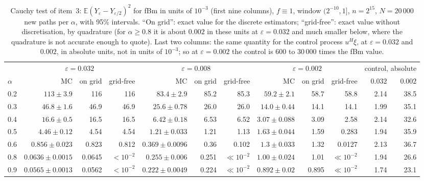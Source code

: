 \documentclass[11pt]{article}
\theoremstyle{remark}
\theoremstyle{definition}
\newcommand{\E}{\mathbb{E}}
\begin{document}
\begin{table}[t]
\centering\scriptsize
\setlength{\tabcolsep}{1.9pt}
\begin{tabular}{@{}lrrrrrrrrrrr@{}}
\toprule
 & \multicolumn{3}{c}{$\varepsilon=0.032$} & \multicolumn{3}{c}{$\varepsilon=0.008$} & \multicolumn{3}{c}{$\varepsilon=0.002$} & \multicolumn{2}{c}{control, absolute}\\
\cmidrule(lr){2-4}\cmidrule(lr){5-7}\cmidrule(lr){8-10}\cmidrule(l){11-12}
$\alpha$ & MC & on grid & grid-free & MC & on grid & grid-free & MC & on grid & grid-free & $0.032$ & $0.002$\\
\midrule
0.2 & $113\pm3.9$ & 116 & 116 & $83.4\pm2.9$ & 85.2 & 85.3 & $59.2\pm2.1$ & 58.7 & 58.8 & 2.14 & 38.5\\
0.3 & $46.8\pm1.6$ & 46.9 & 46.9 & $25.6\pm0.78$ & 26.0 & 26.0 & $14.0\pm0.44$ & 14.1 & 14.1 & 1.99 & 35.1\\
0.4 & $16.6\pm0.5$ & 16.5 & 16.5 & $6.42\pm0.18$ & 6.53 & 6.52 & $3.07\pm0.088$ & 3.09 & 2.58 & 2.14 & 32.6\\
0.5 & $4.46\pm0.12$ & 4.54 & 4.54 & $1.21\pm0.033$ & 1.21 & 1.13 & $1.63\pm0.044$ & 1.59 & 0.283 & 1.94 & 35.9\\
0.6 & $0.856\pm0.023$ & 0.823 & 0.812 & $0.369\pm0.0096$ & 0.36 & 0.102 & $1.3\pm0.033$ & 1.32 & 0.0127 & 2.13 & 36.7\\
0.8 & $0.0636\pm0.0015$ & 0.0645 & $<10^{-2}$ & $0.255\pm0.006$ & 0.251 & $\ll10^{-2}$ & $1.00\pm0.024$ & 1.01 & $\ll10^{-2}$ & 1.94 & 26.6\\
0.9 & $0.0565\pm0.0013$ & 0.0562 & $<10^{-2}$ & $0.222\pm0.0049$ & 0.224 & $\ll10^{-2}$ & $0.892\pm0.02$ & 0.895 & $\ll10^{-2}$ & 1.74 & 23.1\\
\bottomrule
\end{tabular}
\caption{Cauchy test of item~3: $\E(Y_\varepsilon-Y_{\varepsilon/2})^2$ for fBm in units of $10^{-3}$ (first nine columns), $f\equiv1$, window $(2^{-10},1]$, $n=2^{15}$, $N=20\,000$ new paths per $\alpha$, with 95\% intervals. ``On grid'': exact value for the discrete estimators; ``grid-free'': exact value without discretisation, by quadrature (for $\alpha\ge0.8$ it is about $0.002$ in these units at $\varepsilon=0.032$ and much smaller below, where the quadrature is not accurate enough to quote). Last two columns: the same quantity for the control process $u^H\xi$, at $\varepsilon=0.032$ and $0.002$, in absolute units, not in units of $10^{-3}$; so at $\varepsilon=0.002$ the control is $600$ to $30\,000$ times the fBm value.}
\label{tab:pathwise}
\end{table}
\end{document}
